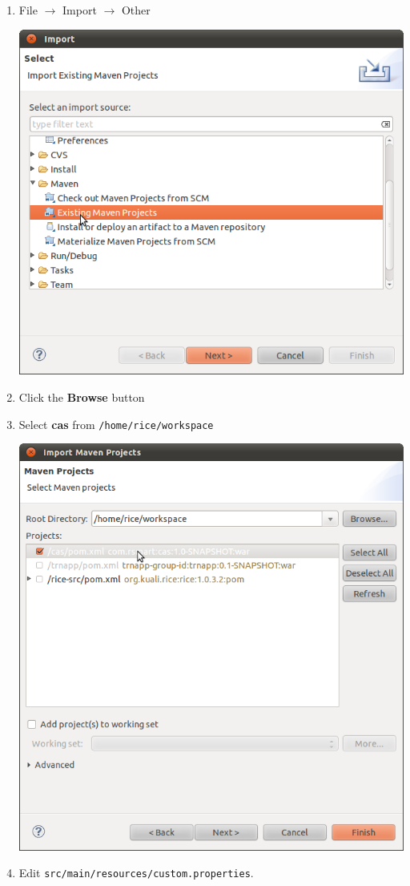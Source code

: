 \begin{enumerate}
\item File $\rightarrow$ Import $\rightarrow$ Other

\includegraphics[width=\textwidth]{images/Screenshot-Import.png}

\item Click the \textbf{Browse} button
\item Select \textbf{cas} from \verb|/home/rice/workspace|

\includegraphics[width=\textwidth]{images/Screenshot14.png}
\item Edit \verb|src/main/resources/custom.properties|.


\end{enumerate}
